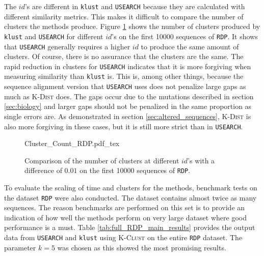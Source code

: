 The $id$'s are different in \texttt{klust} and \texttt{USEARCH} because they
are calculated with different similarity metrics. This makes it difficult to
compare the number of clusters the methods produce. Figure
\ref{fig:id_comparison} shows the number of clusters produced by
\texttt{klust} and \texttt{USEARCH} for different $id$'s on the first
\num{10000} sequences of \texttt{RDP}. It shows that \texttt{USEARCH}
generally requires a higher $id$ to produce the same amount of clusters. Of
course, there is no assurance that the clusters are the same. The rapid
reduction in clusters for \texttt{USEARCH} indicates that it is more forgiving
when measuring similarity than \texttt{klust} is. This is, among other things,
because the sequence alignment version that \texttt{USEARCH} uses does not
penalize large gaps as much as \textsc{K-Dist} does. The gaps occur due to the
mutations described in section \ref{sec:biology} and larger gaps should not be
penalized in the same proportion as single errors are. As demonstrated in
section \ref{sec:altered_sequences}, \textsc{K-Dist} is also more forgiving in
these cases, but it is still more strict than in \texttt{USEARCH}.

\begin{figure}[H]
  \centering
  \def\svgwidth{\columnwidth}
  {Cluster_Count_RDP.pdf_tex}
  \caption{Comparison of the number of clusters at different $id$'s with a difference of $0.01$ on the first \num{10000} sequences of \texttt{RDP}.}
  \label{fig:id_comparison}
\end{figure}

To evaluate the scaling of time and clusters for the methods, benchmark tests
on the dataset \texttt{RDP} were also conducted. The dataset contains almost
twice as many sequences. The reason benchmarks are performed on this set is to
provide an indication of how well the methods perform on very large dataset
where good performance is a must. Table \ref{tab:full_RDP_main_results}
provides the output data from \texttt{USEARCH} and \texttt{klust} using
\textsc{K-Clust} on the entire \texttt{RDP} dataset. The parameter $k=5$ was
chosen as this showed the most promising results.

